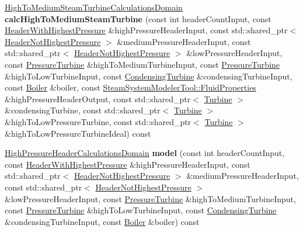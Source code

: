 \begin{DoxyCompactItemize}
\hyperlink{class_high_to_medium_steam_turbine_calculations_domain}{High\+To\+Medium\+Steam\+Turbine\+Calculations\+Domain} {\bfseries calc\+High\+To\+Medium\+Steam\+Turbine} (const int header\+Count\+Input, const \hyperlink{class_header_with_highest_pressure}{Header\+With\+Highest\+Pressure} \&high\+Pressure\+Header\+Input, const std\+::shared\+\_\+ptr$<$ \hyperlink{class_header_not_highest_pressure}{Header\+Not\+Highest\+Pressure} $>$ \&medium\+Pressure\+Header\+Input, const std\+::shared\+\_\+ptr$<$ \hyperlink{class_header_not_highest_pressure}{Header\+Not\+Highest\+Pressure} $>$ \&low\+Pressure\+Header\+Input, const \hyperlink{class_pressure_turbine}{Pressure\+Turbine} \&high\+To\+Medium\+Turbine\+Input, const \hyperlink{class_pressure_turbine}{Pressure\+Turbine} \&high\+To\+Low\+Turbine\+Input, const \hyperlink{class_condensing_turbine}{Condensing\+Turbine} \&condensing\+Turbine\+Input, const \hyperlink{class_boiler}{Boiler} \&boiler, const \hyperlink{struct_steam_system_modeler_tool_1_1_fluid_properties}{Steam\+System\+Modeler\+Tool\+::\+Fluid\+Properties} \&high\+Pressure\+Header\+Output, const std\+::shared\+\_\+ptr$<$ \hyperlink{class_turbine}{Turbine} $>$ \&condensing\+Turbine, const std\+::shared\+\_\+ptr$<$ \hyperlink{class_turbine}{Turbine} $>$ \&high\+To\+Low\+Pressure\+Turbine, const std\+::shared\+\_\+ptr$<$ \hyperlink{class_turbine}{Turbine} $>$ \&high\+To\+Low\+Pressure\+Turbine\+Ideal) const
\item 
\mbox{\label{class_high_pressure_header_modeler_a2ada0d9d67ef16c0256f5ee52358167d}} 
\hyperlink{class_high_pressure_header_calculations_domain}{High\+Pressure\+Header\+Calculations\+Domain} {\bfseries model} (const int header\+Count\+Input, const \hyperlink{class_header_with_highest_pressure}{Header\+With\+Highest\+Pressure} \&high\+Pressure\+Header\+Input, const std\+::shared\+\_\+ptr$<$ \hyperlink{class_header_not_highest_pressure}{Header\+Not\+Highest\+Pressure} $>$ \&medium\+Pressure\+Header\+Input, const std\+::shared\+\_\+ptr$<$ \hyperlink{class_header_not_highest_pressure}{Header\+Not\+Highest\+Pressure} $>$ \&low\+Pressure\+Header\+Input, const \hyperlink{class_pressure_turbine}{Pressure\+Turbine} \&high\+To\+Medium\+Turbine\+Input, const \hyperlink{class_pressure_turbine}{Pressure\+Turbine} \&high\+To\+Low\+Turbine\+Input, const \hyperlink{class_condensing_turbine}{Condensing\+Turbine} \&condensing\+Turbine\+Input, const \hyperlink{class_boiler}{Boiler} \&boiler) const
\item 

\end{DoxyCompactItemize}
